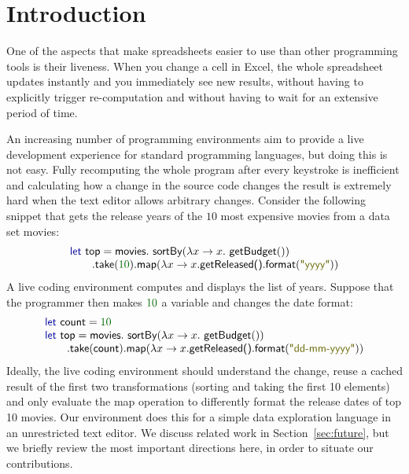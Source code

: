 \documentclass[english,submission]{programming}
\theoremstyle{plain}
\theoremstyle{definition}
\newcommand{\num}[1]{\textcolor{numclr}{#1}}
\newcommand{\str}[1]{\textnormal{\textcolor{strclr}{\sffamily "#1"}}}
\newcommand{\ident}[1]{\textnormal{\textcolor{idclr}{\sffamily #1}}}
\newcommand{\kvd}[1]{\textnormal{\textcolor{kvdclr}{\sffamily #1}}}
\begin{document}
\section{Introduction}
\label{sec:intro}
One of the aspects that make spreadsheets easier to use than other programming tools is their
liveness. When you change a cell in Excel, the whole spreadsheet updates instantly
and you immediately see new results, without having to explicitly trigger re-computation
and without having to wait for an extensive period of time.

An increasing number of programming environments aim to provide a live development experience
for standard programming languages, but doing this is not easy. Fully recomputing the whole program
after every keystroke is inefficient and calculating how a change in the source code changes the
result is extremely hard when the text editor allows arbitrary changes.
Consider the following snippet that gets the release years of the $10$ most expensive movies from a
data set \ident{movies}:
%
\begin{equation*}
\begin{array}{l}
\kvd{let}~\ident{top} =\ident{movies}.\ident{sortBy}(\lambda x \rightarrow x.\ident{getBudget}())\\
\qquad .\ident{take}(\num{10}).\ident{map}(\lambda x \rightarrow x.\ident{getReleased()}.\ident{format}(\str{yyyy}))\\
\end{array}
\end{equation*}
%
A live coding environment computes and displays the list of years. Suppose that the programmer then
makes $\num{10}$ a variable and changes the date format:
%
\begin{equation*}
\begin{array}{l}
\kvd{let}~\ident{count} = \num{10}\\
\kvd{let}~\ident{top} = \ident{movies}.\ident{sortBy}(\lambda x \rightarrow x.\ident{getBudget}())\\
\qquad .\ident{take}(\ident{count}).\ident{map}(\lambda x \rightarrow x.\ident{getReleased()}.\ident{format}(\str{dd-mm-yyyy}))\\
\end{array}
\end{equation*}
%
Ideally, the live coding environment should understand the change, reuse a cached result of the
first two transformations (sorting and taking the first 10 elements) and only evaluate the
\ident{map} operation to differently format the release dates of top 10 movies. Our environment
does this for a simple data exploration language in an unrestricted text editor. We discuss related
work in Section~\ref{sec:future}, but we briefly review the most important directions here, in
order to situate our contributions.
\end{document}
